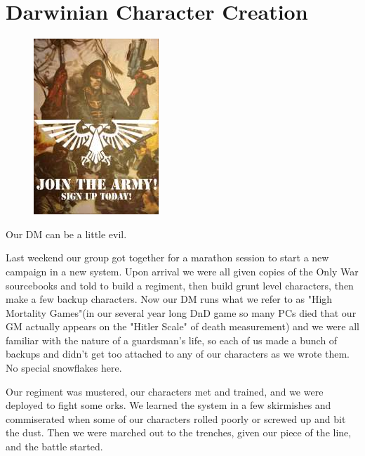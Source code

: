 \chapter{Darwinian Character Creation}

\begin{figure}
	\begin{center}
		\includegraphics[width=\figwidth]{pics/1/1.jpg}
	\end{center}
\end{figure}

Our DM can be a little evil.

Last weekend our group got together for a marathon session to start a new campaign in a new system.
Upon arrival we were all given copies of the Only War sourcebooks and told to build a regiment, then build grunt level characters, then make a few backup characters.
Now our DM runs what we refer to as "High Mortality Games"(in our several year long DnD game so many PCs died that our GM actually appears on the "Hitler Scale" of death measurement) and we were all familiar with the nature of a guardsman's life, so each of us made a bunch of backups and didn't get too attached to any of our characters as we wrote them.
No special snowflakes here.

Our regiment was mustered, our characters met and trained, and we were deployed to fight some orks.
We learned the system in a few skirmishes and commiserated when some of our characters rolled poorly or screwed up and bit the dust.
Then we were marched out to the trenches, given our piece of the line, and the battle started.


